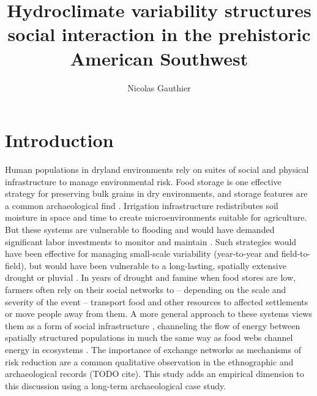 \documentclass[fleqn,10pt]{wlscirep}
\title{Hydroclimate variability structures social interaction in the prehistoric American Southwest}
\author[1,*]{Nicolas Gauthier}
\affil[1]{School of Human Evolution and Social Change, 900 S Caddy Mall, Tempe, USA}
\affil[*]{Nicolas.Gauthier@asu.edu}
\begin{document}
\flushbottom
\maketitle


\thispagestyle{empty}


\section*{Introduction}
Human populations in dryland environments rely on suites of social and physical infrastructure to manage environmental risk. Food storage is one effective strategy for preserving bulk grains in dry environments, and storage features are a common archaeological find \cite{Spielmann2011SustainableEnvironments}. Irrigation infrastructure redistributes soil moisture in space and time to create microenvironments suitable for agriculture. But these systems are vulnerable to flooding and would have demanded significant labor investments to monitor and maintain \cite{Dominguez2005}. Such strategies would have been effective for managing small-scale variability (year-to-year and field-to-field), but would have been vulnerable to a long-lasting, spatially extensive drought or pluvial \cite{Halstead1989}. In years of drought and famine when food stores are low, farmers often rely on their social networks to -- depending on the scale and severity of the event -- transport food and other resources to affected settlements or move people away from them. A more general approach to these systems views them as a form of social infrastructure \cite{STRAWHACKER2015}, channeling the flow of energy between spatially structured populations in much the same way as food webs channel energy in ecosystems \cite{Crabtree2015,Crabtree2017ReconstructingStates}. The importance of exchange networks as mechanisms of risk reduction are a common qualitative observation in the ethnographic and archaeological records (TODO cite). This study adds an empirical dimension to this discussion using a long-term archaeological case study.%
\end{document}
